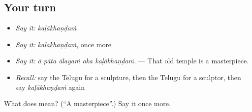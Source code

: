 \subsection*{Your turn}
\begin{itemize}
\raggedright
  \item \emph{Say it:} \emph{kaḷākhaṇḍaṁ}
  \item \emph{Say it:} \emph{kaḷākhaṇḍaṁ}, once more
  \item \emph{Say it:} \emph{ā pāta ālayaṁ oka kaḷākhaṇḍaṁ.} — That old temple is a masterpiece.
  \item \emph{Recall:} say the Telugu for a sculpture, then the Telugu for a sculptor, then say \emph{kaḷākhaṇḍaṁ} again
\end{itemize}

\begin{tcolorbox}[breakable,colback=teal!4,colframe=teal!35!black,title={Before you move on}]
What does  mean? (\textquotedblleft{}A masterpiece\textquotedblright{}.) Say it once more.
\end{tcolorbox}
